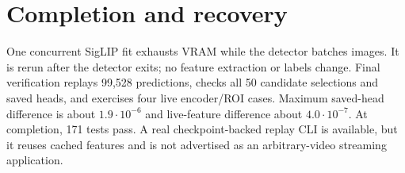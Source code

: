 \section{Completion and recovery}
One concurrent SigLIP fit exhausts VRAM while the detector batches images. It is rerun after the detector exits; no feature extraction or labels change. Final verification replays 99,528 predictions, checks all 50 candidate selections and saved heads, and exercises four live encoder/ROI cases. Maximum saved-head difference is about $1.9\cdot10^{-6}$ and live-feature difference about $4.0\cdot10^{-7}$. At completion, 171 tests pass. A real checkpoint-backed replay CLI is available, but it reuses cached features and is not advertised as an arbitrary-video streaming application.
